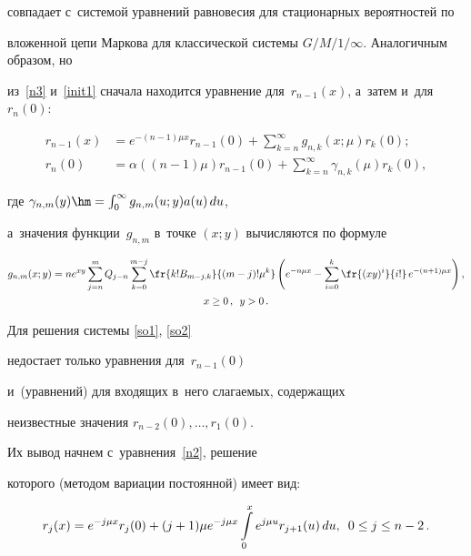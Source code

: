совпадает с~сис\-те\-мой урав\-не\-ний равновесия для стационарных вероятностей по 

вложенной цепи Маркова для классической сис\-те\-мы ${G/M/1/\infty}$. Аналогичным образом, но 

из~\eqref{n3} и~\eqref{init1} сначала находится уравнение для~$r_{n-1}(x)$, а~затем и~для~$r_n(0)$:

\begin{align}

r_{n-1}(x) &= e^{- (n-1) \mu x} r_{n-1}(0) + \sum\limits_{k=n}^{\infty} g_{n,k}(x;\mu) r_k(0) ;

\label{so2new}

\\

r_n(0)&=

 \alpha((n-1)\mu) r_{n-1}(0) + \sum\limits_{k=n}^{\infty} \gamma_{n,k}(\mu) r_k(0),

\label{so2}

\end{align}

где $\gamma_{n,m}(y)\hm=\int\nolimits_0^\infty g_{n,m}(u;y)a(u)\,du$,

а~значения функции~$g_{n,m}$ в~точке $(x;y)$ вычисляются по формуле

\begin{multline*}

g_{n,m}(x;y)= n e^{xy} \sum\limits_{j=n}^{m}

Q_{j-n} \sum\limits_{k=0}^{m-j}  \fr{k!  B_{m-j,k}}{(m-j)! \mu^k}\left(

e^{-n \mu x} -\sum\limits_{i=0}^k

\fr{(xy)^i}{i!}\, e^{-(n+1)\mu x} \right ),\\

 x \ge 0\,, \enskip y >0\,.

\end{multline*}



Для решения системы \eqref{so1}, \eqref{so2}

недостает только уравнения для~$r_{n-1}(0)$

и~(уравнений) для входящих в~него слагаемых, содержащих

неизвестные значения $r_{n-2}(0),\ldots,r_1(0)$.

Их вывод начнем с~уравнения~\eqref{n2}, решение

которого (методом вариации постоянной) имеет вид:

\begin{equation}

r_j(x) =e^{-j\mu x} r_j(0) + (j+1)\mu e^{-j\mu x} 

\int\limits_0^x e^{j\mu u} r_{j+1}(u)\, du, \enskip 0 \le j\le 

n-2\,.

\label{so3}

\end{equation}


